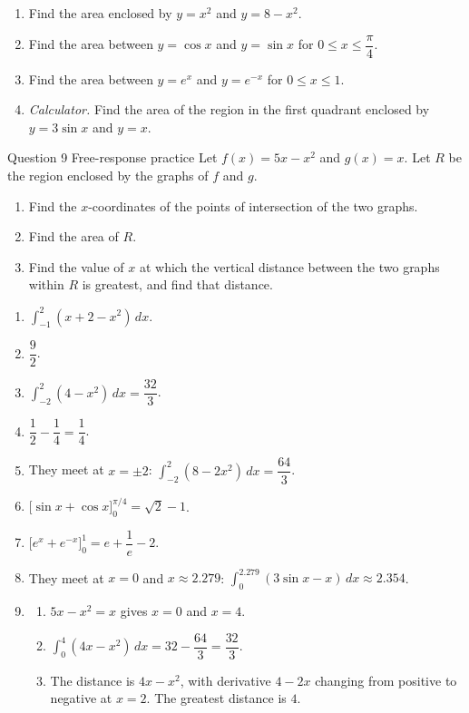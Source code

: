 \documentclass[11pt]{article}
\begin{document}
\begin{enumerate}[leftmargin=*,itemsep=2pt,start=5]
  \item Find the area enclosed by $y=x^2$ and $y=8-x^2$.\work{2.8cm}
  \item Find the area between $y=\cos x$ and $y=\sin x$ for $0\le x\le\dfrac\pi4$.\work{2.8cm}
  \item Find the area between $y=e^{x}$ and $y=e^{-x}$ for $0\le x\le1$.\work{2.8cm}
  \item \emph{Calculator.} Find the area of the region in the first quadrant enclosed by $y=3\sin x$ and $y=x$.\work{2.8cm}
\end{enumerate}

\begin{frbox}{Question 9 \textperiodcentered{} Free-response practice}
Let $f(x)=5x-x^2$ and $g(x)=x$. Let $R$ be the region enclosed by the graphs of $f$ and $g$.
\begin{enumerate}[label=(\alph*),leftmargin=*,itemsep=2pt]
  \item Find the $x$-coordinates of the points of intersection of the two graphs.\work{2.6cm}
  \item Find the area of $R$.\work{2.6cm}
  \item Find the value of $x$ at which the vertical distance between the two graphs within $R$ is greatest, and find that distance.\work{2.6cm}
\end{enumerate}
\end{frbox}

\newpage
\begin{solbox}
\begin{enumerate}[leftmargin=*,itemsep=4pt]
  \item $\displaystyle\int_{-1}^{2}(x+2-x^2)\,dx$.
  \item $\dfrac92$.
  \item $\displaystyle\int_{-2}^{2}(4-x^2)\,dx=\dfrac{32}{3}$.
  \item $\dfrac12-\dfrac14=\dfrac14$.
  \item They meet at $x=\pm2$: $\displaystyle\int_{-2}^{2}(8-2x^2)\,dx=\dfrac{64}{3}$.
  \item $\Big[\sin x+\cos x\Big]_0^{\pi/4}=\sqrt2-1$.
  \item $\Big[e^{x}+e^{-x}\Big]_0^1=e+\dfrac1e-2$.
  \item They meet at $x=0$ and $x\approx2.279$: $\displaystyle\int_{0}^{2.279}(3\sin x-x)\,dx\approx2.354$.
  \item \begin{enumerate}[label=(\alph*),leftmargin=*,itemsep=3pt]
    \item $5x-x^2=x$ gives $x=0$ and $x=4$.
    \item $\displaystyle\int_{0}^{4}(4x-x^2)\,dx=32-\dfrac{64}{3}=\dfrac{32}{3}$.
    \item The distance is $4x-x^2$, with derivative $4-2x$ changing from positive to negative at $x=2$. The greatest distance is $4$.
  \end{enumerate}
\end{enumerate}
\end{solbox}
\end{document}
